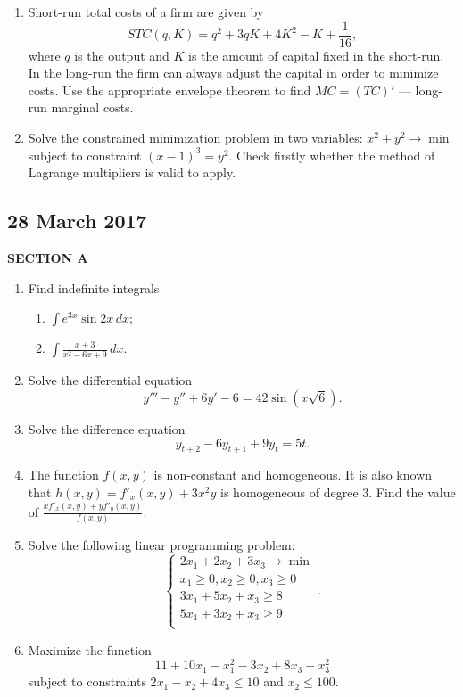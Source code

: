 \documentclass[12pt]{article} %
\theoremstyle{definition} %
\begin{document}
\begin{enumerate}[resume]
\item Short-run total costs of a firm are given by
\[
STC(q,K) = {q^2} + 3qK + 4{K^2} - K + \frac{1}{{16}},
\]
where  $q$ is the output and $K$ is the amount of capital fixed in the short-run. In the long-run the firm can always adjust the capital in order to minimize costs. Use the appropriate envelope theorem to find $MC = (TC)'$ — long-run marginal costs.

\item Solve the constrained minimization problem in two variables: $x^2 + y^2 \to \min$ subject to constraint $(x - 1)^3 = y^2$. Check firstly whether the method of Lagrange multipliers is valid to apply.


\end{enumerate}



\subsection{28 March 2017}

\textbf{SECTION A}

\begin{enumerate}

\item Find indefinite integrals
\begin{enumerate}
  \item  $\int {{e^{3x}}\sin 2x \, dx}$;
  \item  $\int {\frac{{x + 3}}{{{x^2} - 6x + 9}} \, dx}$.
\end{enumerate}

\item Solve the differential equation
\[
y''' - y'' + 6y' - 6 = 42\sin (x\sqrt 6 ).
\]

\item Solve the difference equation
\[
{y_{t + 2}} - 6{y_{t + 1}} + 9{y_t} = 5t.
\]

\item The function $f(x, y)$ is non-constant and homogeneous. It is also known that $h(x, y) = f'_x(x, y) + 3x^2y$ is homogeneous of degree 3. Find the value of $\frac{xf'_x(x, y) + yf'_y(x, y)}{f(x, y)}$.

\item Solve the following linear programming problem:
\[
\begin{cases}
2x_1 + 2x_2 + 3x_3 \to \min \\
x_1 \geq 0, x_2 \geq 0, x_3 \geq 0 \\
3x_1 + 5x_2 + x_3 \geq 8 \\
5x_1 + 3x_2 + x_3 \geq 9 \\
\end{cases}.
\]

\item Maximize the function
\[
11 + 10x_1 - x_1^2 -3x_2 + 8x_3 - x_3^2
\]
subject to constraints $2x_1 -x_2+4x_3 \leq 10$ and $x_2 \leq 100$.

\end{enumerate}
\end{document}
